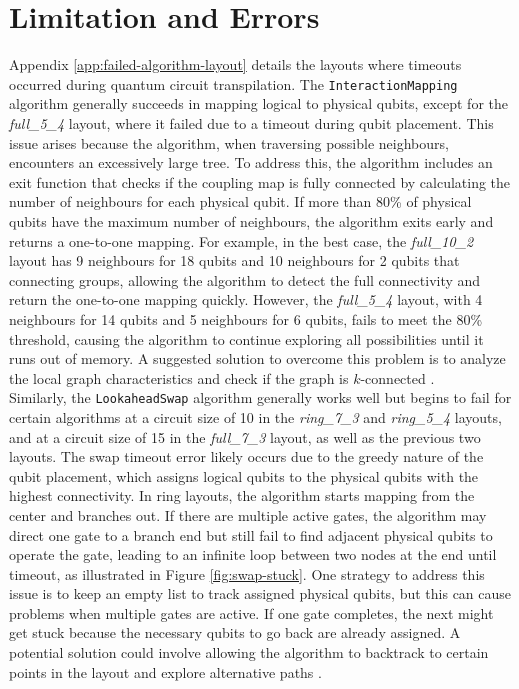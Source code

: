 
\section{Limitation and Errors} %
Appendix \ref{app:failed-algorithm-layout} details the layouts where timeouts occurred during quantum circuit transpilation. The \lstinline{InteractionMapping} algorithm generally succeeds in mapping logical to physical qubits, except for the \textit{full\_5\_4} layout, where it failed due to a timeout during qubit placement. This issue arises because the algorithm, when traversing possible neighbours, encounters an excessively large tree. To address this, the algorithm includes an exit function that checks if the coupling map is fully connected by calculating the number of neighbours for each physical qubit. If more than 80\% of physical qubits have the maximum number of neighbours, the algorithm exits early and returns a one-to-one mapping. For example, in the best case, the \textit{full\_10\_2} layout has 9 neighbours for 18 qubits and 10 neighbours for 2 qubits that connecting groups, allowing the algorithm to detect the full connectivity and return the one-to-one mapping quickly. However, the \textit{full\_5\_4} layout, with 4 neighbours for 14 qubits and 5 neighbours for 6 qubits, fails to meet the 80\% threshold, causing the algorithm to continue exploring all possibilities until it runs out of memory. A suggested solution to overcome this problem is to analyze the local graph characteristics and check if the graph is $k$-connected \cite{cornejo_connectivity_2010}. \\
Similarly, the \lstinline{LookaheadSwap} algorithm generally works well but begins to fail for certain algorithms at a circuit size of 10 in the \textit{ring\_7\_3} and \textit{ring\_5\_4} layouts, and at a circuit size of 15 in the \textit{full\_7\_3} layout, as well as the previous two layouts. The swap timeout error likely occurs due to the greedy nature of the qubit placement, which assigns logical qubits to the physical qubits with the highest connectivity. In ring layouts, the algorithm starts mapping from the center and branches out. If there are multiple active gates, the algorithm may direct one gate to a branch end but still fail to find adjacent physical qubits to operate the gate, leading to an infinite loop between two nodes at the end until timeout, as illustrated in Figure \ref{fig:swap-stuck}. One strategy to address this issue is to keep an empty list to track assigned physical qubits, but this can cause problems when multiple gates are active. If one gate completes, the next might get stuck because the necessary qubits to go back are already assigned. A potential solution could involve allowing the algorithm to backtrack to certain points in the layout and explore alternative paths \cite{parizek_fast_2019}.

